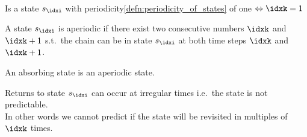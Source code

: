 \begin{defnbox}\nospacing
  \begin{defn}[Aperiodic State\hfill$\tc{black}{\idxk=1}$]\label{defn:aperiodic_state}\leavevmode\\
    Is a state $s_{\idxi}$ with periodicity\cref{defn:periodicity_of_states} of one $\Leftrightarrow\idxk=1$
  \end{defn}
\end{defnbox}
\begin{corbox}\nospacing
  \begin{cor}
    A state $s_{\idxi}$ is aperiodic if there exist two consecutive numbers $\idxk$ and $\idxk+1$
    s.t.\ the chain can be in state $s_{\idxi}$ at both time steps $\idxk$ and $\idxk+1$.
  \end{cor}
\end{corbox}
\begin{corbox}\nospacing
  \begin{cor}\label{cor:absorbing_state}
    An absorbing state is an aperiodic state.
  \end{cor}
\end{corbox}
\begin{explanationbox}
  \begin{explanation}
    Returns to state $s_{\idxi}$ can occur at irregular times i.e.\ the state is not predictable.\\
    In other words we cannot predict if the state will be revisited in multiples of $\idxk$ times.
  \end{explanation}
\end{explanationbox}

